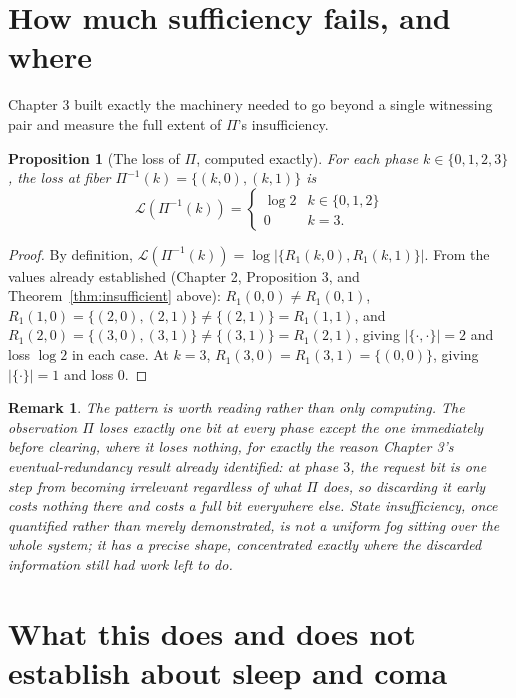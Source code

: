 \documentclass[11pt]{report}
\newtheorem{proposition}{Proposition}[chapter]
\newtheorem{remark}{Remark}[chapter]
\begin{document}
\section*{How much sufficiency fails, and where}

Chapter 3 built exactly the machinery needed to go beyond a single
witnessing pair and measure the full extent of $\Pi$'s insufficiency.

\begin{proposition}[The loss of $\Pi$, computed exactly]
For each phase $k \in \{0,1,2,3\}$, the loss at fiber $\Pi^{-1}(k) =
\{(k,0),(k,1)\}$ is
\[
\mathcal{L}(\Pi^{-1}(k)) = \begin{cases} \log 2 & k \in \{0,1,2\} \\ 0 & k = 3. \end{cases}
\]
\end{proposition}
\begin{proof}
By definition, $\mathcal{L}(\Pi^{-1}(k)) = \log|\{R_1(k,0), R_1(k,1)\}|$.
From the values already established (Chapter 2, Proposition 3, and
Theorem~\ref{thm:insufficient} above): $R_1(0,0) \neq R_1(0,1)$,
$R_1(1,0) = \{(2,0),(2,1)\} \neq \{(2,1)\} = R_1(1,1)$, and
$R_1(2,0) = \{(3,0),(3,1)\} \neq \{(3,1)\} = R_1(2,1)$, giving
$|\{\cdot,\cdot\}| = 2$ and loss $\log 2$ in each case. At $k=3$,
$R_1(3,0) = R_1(3,1) = \{(0,0)\}$, giving $|\{\cdot\}| = 1$ and loss
$0$.
\end{proof}

\begin{remark}
The pattern is worth reading rather than only computing. The
observation $\Pi$ loses exactly one bit at every phase except the one
immediately before clearing, where it loses nothing, for exactly the
reason Chapter 3's eventual-redundancy result already identified: at
phase $3$, the request bit is one step from becoming irrelevant
regardless of what $\Pi$ does, so discarding it early costs nothing
there and costs a full bit everywhere else. State insufficiency, once
quantified rather than merely demonstrated, is not a uniform fog
sitting over the whole system; it has a precise shape, concentrated
exactly where the discarded information still had work left to do.
\end{remark}

\section*{What this does and does not establish about sleep and coma}
\end{document}
